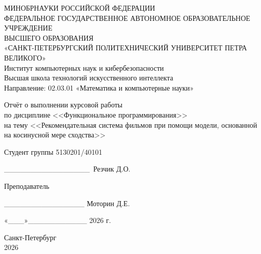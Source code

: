 \documentclass[a4paper, 16pt]{article}
\begin{document}
\thispagestyle{empty}
\begin{center}
{\large 
МИНОБРНАУКИ РОССИЙСКОЙ ФЕДЕРАЦИИ \\ФЕДЕРАЛЬНОЕ ГОСУДАРСТВЕННОЕ  
АВТОНОМНОЕ ОБРАЗОВАТЕЛЬНОЕ УЧРЕЖДЕНИЕ \\ ВЫСШЕГО ОБРАЗОВАНИЯ \\ \vspace{7pt} «САНКТ-ПЕТЕРБУРГСКИЙ ПОЛИТЕХНИЧЕСКИЙ УНИВЕРСИТЕТ ПЕТРА ВЕЛИКОГО»\\ \vspace{7pt} Институт компьютерных наук и кибербезопасности\\ \vspace{4pt} Высшая школа технологий искусственного интеллекта\\ \vspace{4pt} Направление: 02.03.01 «Математика и компьютерные науки»

\vspace{100pt}
Отчёт о выполнении курсовой работы \\ по дисциплине <<Функциональное программирования>> \\ на тему <<Рекомендательная система фильмов при помощи модели,
основанной на косинусной мере сходства>>

}
\end{center}

\vspace{70pt}
\noindent Студент группы 5130201/40101 \vspace{-20pt}\begin{flushright} \_\!\_\!\_\!\_\!\_\!\_\!\_\!\_\!\_\!\_\!\_\!\_\!\_\!\_\!\_\!\_\!\ Резчик Д.О.
\end{flushright} \par

\noindent Преподаватель\vspace{-25pt}\begin{flushright} \_\!\_\!\_\!\_\!\_\!\_\!\_\!\_\!\_\!\_\!\_\!\_\!\_\!\_\!\_ Моторин Д.Е. \end{flushright}

\vspace{70pt}
\begin{flushright}
    «\_\!\_\!\_»\_\!\_\!\_\!\_\!\_\!\_\!\_\!\_\!\_\!\_\!\_ 2026 г.
\end{flushright}

\vspace{20pt}
\begin{center}
Санкт-Петербург \\ 2026
\end{center}
\newpage
\end{document}
